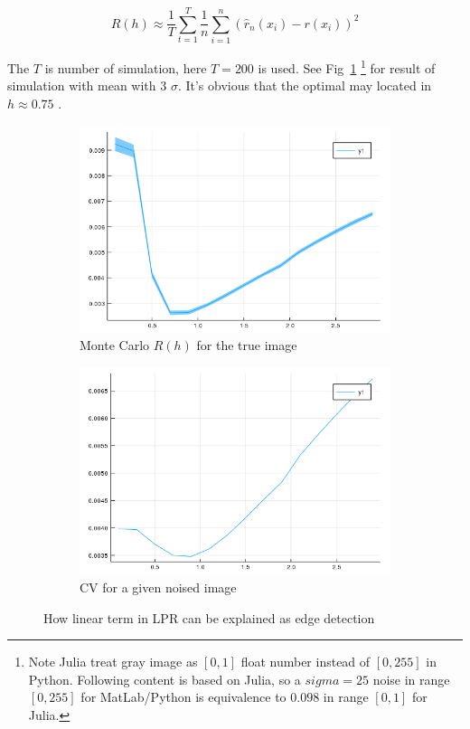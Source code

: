 \documentclass{article}
\begin{document}
$$
R(h) \approx \frac{1}{T} \sum_{t=1}^T \frac{1}{n}\sum_{i=1}^n(\hat{r}_n(x_i)-r(x_i))^2
$$

The $T$ is number of simulation, here $T=200$ is used. See Fig~\ref{fig:crossvalidation}
\footnote{Note Julia treat gray image as $[0,1]$ float number instead of $[0,255]$ in Python. Following content is based on Julia,
so a $sigma=25$ noise in range $[0,255]$ for MatLab/Python is equivalence to $0.098$ in range $[0,1]$ for Julia.}
 for result of simulation with mean with 3 $\sigma$. 
It's obvious that the optimal may located in $h \approx 0.75$ .

\begin{figure}[htb]
  \centering
  \begin{subfigure}[b]{0.49\linewidth}
    \includegraphics[width=\linewidth]{images/crossvalidation1.png}
    \caption{Monte Carlo $R(h)$ for the true image}
  \end{subfigure}
  \begin{subfigure}[b]{0.49\linewidth}
    \includegraphics[width=\linewidth]{images/crossvalidation2.png}
    \caption{CV for a given noised image}
  \end{subfigure}
  \caption{How linear term in LPR can be explained as edge detection}
  \label{fig:crossvalidation}
\end{figure}
\end{document}
